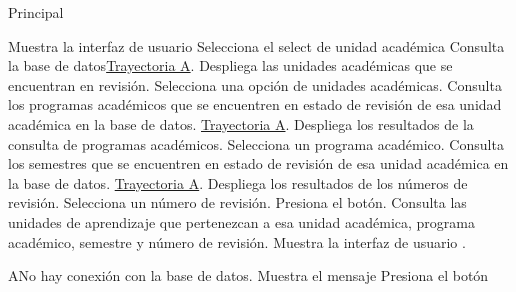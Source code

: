 \begin{UCtrayectoria}{Principal}


    \UCpaso Muestra la interfaz de usuario 
    \UCpaso [\UCactor] Selecciona el select de unidad académica
    \UCpaso Consulta la base de datos\hyperref[SP2-CU5-A]{Trayectoria A}.
    \UCpaso Despliega las unidades académicas que se encuentran en revisión.
    \UCpaso [\UCactor] Selecciona una opción de unidades académicas.
    \UCpaso Consulta los programas académicos que se encuentren en estado de revisión de esa unidad académica en la base de datos. \hyperref[SP2-CU5-A]{Trayectoria A}.
    \UCpaso Despliega los resultados de la consulta de programas académicos.
    \UCpaso [\UCactor] Selecciona un programa académico.
    \UCpaso Consulta los semestres que se encuentren en estado de revisión de esa unidad académica en la base de datos. \hyperref[SP2-CU5-A]{Trayectoria A}.
    \UCpaso Despliega los resultados de los números de revisión.
    \UCpaso [\UCactor] Selecciona un número de revisión.
    \UCpaso [\UCactor] Presiona el botón. 
    \UCpaso Consulta las unidades de aprendizaje que pertenezcan a esa unidad académica, programa académico, semestre y número de revisión.
    \UCpaso Muestra la interfaz de usuario .

\end{UCtrayectoria}


\label{SP2-CU5-A}
\begin{UCtrayectoriaA}{A}{No hay conexión con la base de datos.}
    \UCpaso Muestra el mensaje 
    \UCpaso[\UCactor] Presiona el botón 
\end{UCtrayectoriaA}




